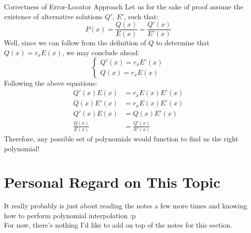 \begin{ln-theorem}{Correctness of Error-Locator Approach}{}
    Let us for the sake of proof assume the existence of alternative solutions $Q'$, $E'$, such that:
    \[P(x) = \frac{Q(x)}{E(x)} = \frac{Q'(x)}{E'(x)}\]
    Well, since we can follow from the definition of $Q$ to determine that $Q(x) = r_x E(x)$, we may conclude ahead:
    \[
        \begin{cases}
            Q'(x) = r_x E'(x) \\
            Q(x) = r_x E(x)
        \end{cases}
    \]
    Following the above equations:
    \begin{align*}
        Q'(x) E(x) &= r_x E(x) E'(x) \\
        Q(x) E'(x) &= r_x E(x) E'(x) \\
        Q'(x) E(x) &= Q(x) E'(x) \\
        \frac{Q(x)}{E(x)} &= \frac{Q'(x)}{E'(x)}
    \end{align*}
    Therefore, any possible set of polynomials would function to find us the right polynomial!
\end{ln-theorem}

\section{Personal Regard on This Topic}
It really probably is just about reading the notes a few more times and knowing how to perform polynomial interpolation :p \\
For now, there's nothing I'd like to add on top of the notes for this section.
